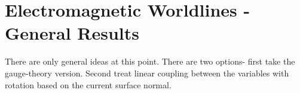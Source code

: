 \chapter{Electromagnetic Worldlines - General Results}

There are only general ideas at this point.
There are two options- first take the gauge-theory version.
Second treat linear coupling between the variables with rotation based on the current surface normal.




